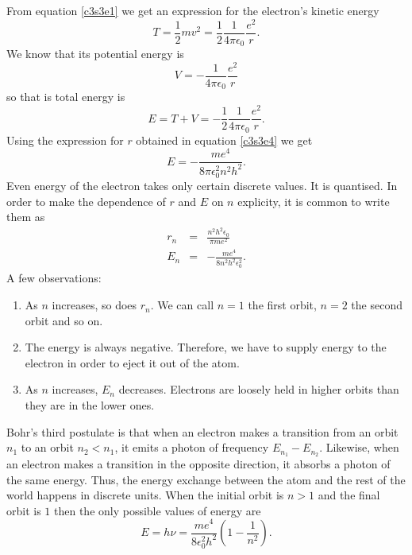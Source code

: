 From equation \eqref{c3s3e1} we get an expression for the electron's kinetic
energy
\begin{equation}\label{c3s3e5}
T = \frac{1}{2}mv^2 = \frac{1}{2}\frac{1}{4\pi\epsilon_0}\frac{e^2}{r}.
\end{equation}
We know that its potential energy is
\begin{equation}\label{c3s3e6}
V = -\frac{1}{4\pi\epsilon_0}\frac{e^2}{r}
\end{equation}
so that is total energy is
\begin{equation}\label{c3s3e7}
E = T + V = -\frac{1}{2}\frac{1}{4\pi\epsilon_0}\frac{e^2}{r}.
\end{equation}
Using the expression for $r$ obtained in equation \eqref{c3s3e4} we get
\begin{equation}\label{c3s3e8}
E = -\frac{me^4}{8\pi\epsilon_0^2 n^2h^2}.
\end{equation}
Even energy of the electron takes only certain discrete values. It is quantised.
In order to make the dependence of $r$ and $E$ on $n$ explicity, it is common to
write them as
\begin{eqnarray}
r_n &=& \frac{n^2 h^2 \epsilon_0}{\pi me^2} \label{c3s3e9} \\
E_n &=& -\frac{me^4}{8 n^2h^2\epsilon_0^2}. \label{c3s3e10}
\end{eqnarray}
A few observations:
\begin{enumerate}
\item As $n$ increases, so does $r_n$. We can call $n = 1$ the first orbit, 
$n = 2$ the second orbit and so on.
\item The energy is always negative. Therefore, we have to supply energy to the
electron in order to eject it out of the atom.
\item As $n$ increases, $E_n$ decreases. Electrons are loosely held in higher 
orbits than they are in the lower ones.
\end{enumerate}
Bohr's third postulate is that when an electron makes a transition from an orbit
$n_1$ to an orbit $n_2 < n_1$, it emits a photon of frequency $E_{n_1}-E_{n_2}$.
Likewise, when an electron makes a transition in the opposite direction, it 
absorbs a photon of the same energy. Thus, the energy exchange between the atom
and the rest of the world happens in discrete units. When the initial orbit is
$n > 1$ and the final orbit is $1$ then the only possible values of energy are
\begin{equation}\label{c3s3e11}
E=h\nu=\frac{me^4}{8\epsilon_0^2h^2}\left(1 - \frac{1}{n^2}\right).
\end{equation}


